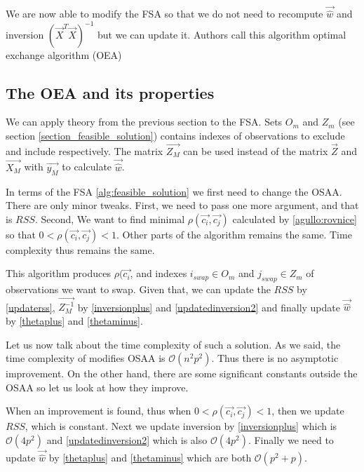 We are now able to modify the FSA so that we do not need to recompute $\vec{\hat{w}}$ and inversion $(\vec{X}^T \vec{X})^{-1}$ but we can update it. Authors call this algorithm optimal exchange algorithm (OEA)






\subsection{The OEA and its properties}
We can apply theory from the previous section to the FSA. Sets $O_m$ and $Z_m$ (see section \ref{section_feasible_solution}) contains indexes of observations to exclude and include respectively.
The matrix $\vec{Z_M}$ can be used instead of the matrix $\vec{Z}$ and
 $\vec{X_M}$ with $\vec{y_M}$ to calculate $\vec{\hat{w}}$. 

In terms of the FSA \ref{alg:feasible_solution} we first need to change the OSAA.  There are only minor tweaks. First, we need to pass one more argument, and that is $RSS$. Second, We want to find minimal $\rho(\vec{c_i}, \vec{c_j})$ calculated by \eqref{agullo:rovnice} so that $0 < \rho(\vec{c_i}, \vec{c_j}) < 1 $. Other parts of the algorithm remains the same. Time complexity thus remains the same.

This algorithm produces $\rho(\vec{c_i}$, and indexes  $i_{swap} \in O_m$ and $j_{swap} \in Z_m$ of observations we want to swap. Given that, we can update the $RSS$ by \eqref{updaterss}, $\vec{Z_M^{-1}}$ by \eqref{inversionplus} and \eqref{updatedinversion2} and finally update $\vec{\hat{w}}$ by \eqref{thetaplus} and \eqref{thetaminus}.

Let us now talk about the time complexity of such a solution. As we said, the time complexity of modifies OSAA is $\mathcal{O}( n^2 p^2)$. Thus there is no asymptotic improvement. On the other hand, there are some significant constants outside the OSAA so let us look at how they improve.

When an improvement is found, thus when $0 < \rho(\vec{c_i}, \vec{c_j}) < 1 $, then we update $RSS$, which is constant. Next we update inversion by
\eqref{inversionplus} which is $\mathcal{O}(4p^2)$ and \eqref{updatedinversion2} which is also $\mathcal{O}(4p^2)$.  Finally we need to update $\vec{\hat{w}}$ by \eqref{thetaplus} and \eqref{thetaminus} which are both $\mathcal{O}(p^2 +p)$. 

